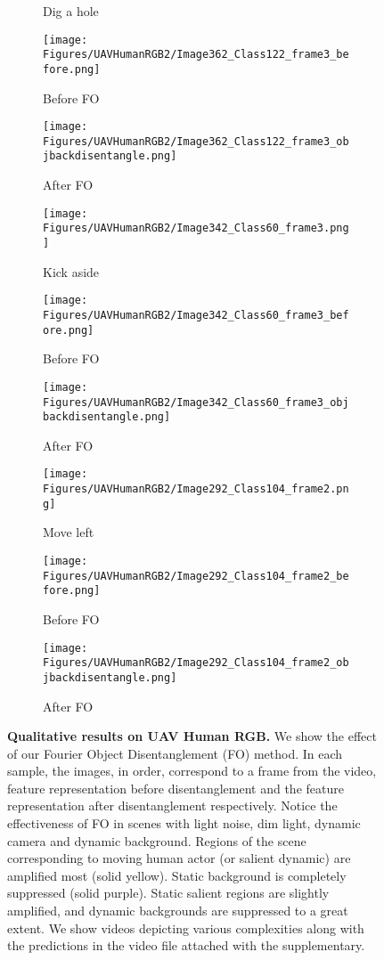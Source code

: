 \documentclass[runningheads]{llncs}
\begin{document}
\begin{figure*}[t]
\begin{subfigure}[b]{0.1\textwidth}
    \caption{Dig a hole}
    \end{subfigure}
    \begin{subfigure}[b]{0.1\textwidth}
    \texttt{[image: Figures/UAVHumanRGB2/Image362\_Class122\_frame3\_before.png]}
    \caption{Before FO}
    \end{subfigure}
    \begin{subfigure}[b]{0.1\textwidth}
    \texttt{[image: Figures/UAVHumanRGB2/Image362\_Class122\_frame3\_objbackdisentangle.png]}
    \caption{After FO}
    \end{subfigure}
    \begin{subfigure}[b]{0.1\textwidth}
    \texttt{[image: Figures/UAVHumanRGB2/Image342\_Class60\_frame3.png]}
    \caption{Kick aside}
    \end{subfigure}
    \begin{subfigure}[b]{0.1\textwidth}
    \texttt{[image: Figures/UAVHumanRGB2/Image342\_Class60\_frame3\_before.png]}
    \caption{Before FO}
    \end{subfigure}
    \begin{subfigure}[b]{0.1\textwidth}
    \texttt{[image: Figures/UAVHumanRGB2/Image342\_Class60\_frame3\_objbackdisentangle.png]}
    \caption{After FO}
    \end{subfigure}
    \begin{subfigure}[b]{0.1\textwidth}
    \texttt{[image: Figures/UAVHumanRGB2/Image292\_Class104\_frame2.png]}
    \caption{Move left}
    \end{subfigure}
    \begin{subfigure}[b]{0.1\textwidth}
    \texttt{[image: Figures/UAVHumanRGB2/Image292\_Class104\_frame2\_before.png]}
    \caption{Before FO}
    \end{subfigure}
    \begin{subfigure}[b]{0.1\textwidth}
    \texttt{[image: Figures/UAVHumanRGB2/Image292\_Class104\_frame2\_objbackdisentangle.png]}
    \caption{After FO}
    \end{subfigure}
   
    \caption{\small{\textbf{Qualitative results on UAV Human RGB.} We show the effect of our Fourier Object Disentanglement (FO) method. In each sample, the images, in order, correspond to a frame from the video, feature representation before disentanglement and the feature representation after disentanglement respectively. Notice the effectiveness of FO in scenes with light noise, dim light, dynamic camera and dynamic background. Regions of the scene corresponding to moving human actor (or salient dynamic) are amplified most (solid yellow). Static background is completely suppressed (solid purple). Static salient regions are slightly amplified, and dynamic backgrounds are suppressed to a great extent. We show videos depicting various complexities along with the predictions in the video file attached with the supplementary.}}
    \label{fig:visualisations_uavhumanrgb1}
    
\end{figure*}
\end{document}
